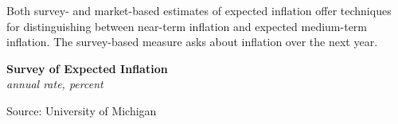 \documentclass{report}
\makeatletter
\newcommand{\tbllink}[1]{\href{https://raw.githubusercontent.com/bdecon/US-chartbook/master/chartbook/data/#1}{\faTable}}
\newcommand*\short[1]{\expandafter\@gobbletwo\number\numexpr#1\relax}
\newcommand{\dateaxisticks}{
		date coordinates in=x, axis line style={draw=none},
		xmax={2022-03-15},
		max space between ticks=40,	    
		xtick={{1990-01-01}, {1992-01-01}, {1994-01-01}, 
			{1996-01-01}, {1998-01-01}, {2000-01-01}, 
			{2002-01-01}, {2004-01-01}, {2006-01-01},
			{2008-01-01}, {2010-01-01}, {2012-01-01}, {2014-01-01},
		    {2016-01-01}, {2018-01-01}, {2020-01-01}, {2022-01-01}, 
		    {2024-01-01}, {2026-01-01}},
		minor xtick={{1989-01-01}, {1991-01-01}, {1993-01-01},
			{1995-01-01}, {1997-01-01}, {1999-01-01}, 
			{2001-01-01}, {2003-01-01}, {2005-01-01}, {2007-01-01},
		    {2009-01-01}, {2011-01-01}, {2013-01-01}, {2015-01-01},
		    {2017-01-01}, {2019-01-01}, {2021-01-01}, {2023-01-01}, 
		    {2025-01-01}, {2027-01-01}},
		enlarge y limits={0.06}, enlarge x limits={0.01},
		}
\newcommand{\bbar}[2]{extra #1 ticks = {{#2}}, extra #1 tick labels = ,
		extra #1 tick style = {grid=major, grid style={thick, black!25}},}
\newcommand{\stdline}[4]{\addplot[very thick, no markers, color=#1] 
		table [x=#2, y=#3, col sep=comma] {#4};	}
\newcommand{\rbars}{
		\fill[color=black!10] (axis cs:{1990-07-01},\pgfkeysvalueof{/pgfplots/ymin}) rectangle 
			(axis cs:{1991-03-01}, \pgfkeysvalueof{/pgfplots/ymax});
		\fill[color=black!10] (axis cs:{2007-12-01},\pgfkeysvalueof{/pgfplots/ymin}) rectangle 
			(axis cs:{2009-07-01}, \pgfkeysvalueof{/pgfplots/ymax});
		\fill[color=black!10] (axis cs:{2001-03-01},\pgfkeysvalueof{/pgfplots/ymin}) rectangle 
			(axis cs:{2001-11-01}, \pgfkeysvalueof{/pgfplots/ymax});
		\fill[color=black!10] (axis cs:{2020-02-01},\pgfkeysvalueof{/pgfplots/ymin}) rectangle 
			(axis cs:{2020-05-01}, \pgfkeysvalueof{/pgfplots/ymax});}
\makeatother
\begin{document}
{{\begin{minipage}{0.33\textwidth}

\end{minipage}
\vspace{1mm}

\begin{minipage}{0.76\textwidth}

\small Both survey- and market-based estimates of expected inflation offer techniques for distinguishing between near-term inflation and expected medium-term inflation. The survey-based measure asks about inflation over the next year. 
\vspace{1mm}

\normalsize \textbf{Survey of Expected Inflation}\\
\footnotesize{\textit{annual rate, percent}}\\
\vspace{22mm}

\hspace{4mm} 
\vspace{1mm}

\footnotesize{Source: University of Michigan} \hfill \tbllink{infumichlt.csv}
\end{minipage}
\vspace{1mm}

}}
\end{document}
